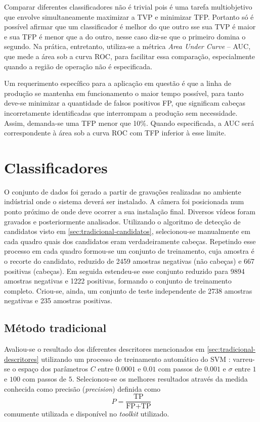 Comparar diferentes classificadores não é trivial pois é uma tarefa multiobjetivo que envolve simultaneamente maximizar a TVP e minimizar TFP. Portanto só é possível afirmar que um classificador é melhor do que outro sse sua TVP é maior e sua TFP é menor que a do outro, nesse caso diz-se que o primeiro domina o segundo. Na prática, entretanto, utiliza-se a métrica \textit{Area Under Curve} -- AUC, que mede a área sob a curva ROC, para facilitar essa comparação, especialmente quando a região de operação não é especificada.

Um requerimento específico para a aplicação em questão é que a linha de produção se mantenha em funcionamento o maior tempo possível, para tanto deve-se minimizar a quantidade de falsos positivos FP, que significam cabeças incorretamente identificadas que interrompam a produção sem necessidade. Assim, demanda-se uma TFP menor que 10\%. Quando especificada, a AUC será correspondente à área sob a curva ROC com TFP inferior à esse limite.

\section{Classificadores}
\label{sec:resultados-classificadores}
O conjunto de dados foi gerado a partir de gravações realizadas no ambiente indústrial onde o sistema deverá ser instalado. A câmera foi posicionada num ponto próximo de onde deve ocorrer a sua instalação final. Diversos vídeos foram gravados e posteriormente analisados. Utilizando o algoritmo de detecção de candidatos visto em \ref{sec:tradicional-candidatos}, selecionou-se manualmente em cada quadro quais dos candidatos eram verdadeiramente cabeças. Repetindo esse processo em cada quadro formou-se um conjunto de treinamento, cuja amostra é o recorte do candidato, reduzido de 2459 amostras negativas (não cabeças) e 667 positivas (cabeças). Em seguida estendeu-se esse conjunto reduzido para 9894 amostras negativas e 1222 positivas, formando o conjunto de treinamento completo. Criou-se, ainda, um conjunto de teste independente de 2738 amostras negativas e 235 amostras positivas.

\subsection{Método tradicional}
Avaliou-se o resultado dos diferentes descritores mencionados em \ref{sec:tradicional-descritores} utilizando um processo de treinamento automático do SVM \cite{scikit-learn}: varreu-se o espaço dos parâmetros $C$ entre $0.0001$ e $0.01$ com passos de $0.001$ e $\sigma$ entre $1$ e $100$ com passos de $5$. Selecionou-se os melhores resultados através da medida conhecida como precisão (\textit{precision}) definida como
\begin{equation}
P = \frac{\text{TP}}{\text{FP}+\text{TP}}
\end{equation}
comumente utilizada e disponível no \textit{toolkit} utilizado.

